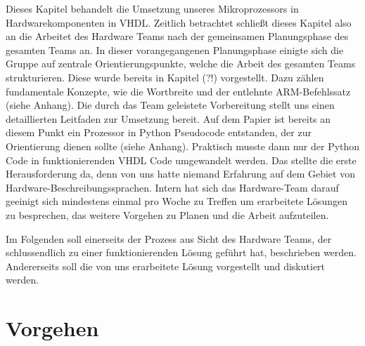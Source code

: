 \documentclass[paper=a4,fontsize=12pt,twocolumn]{scrreprt}
\begin{document}
Dieses Kapitel behandelt die Umsetzung unseres Mikroprozessors in Hardwarekomponenten in VHDL.
Zeitlich betrachtet schließt dieses Kapitel also an die Arbeitet des Hardware Teams nach der gemeinsamen Planungsphase des gesamten Teams an.
In dieser vorangegangenen Planungsphase einigte sich die Gruppe auf zentrale Orientierungspunkte, welche die Arbeit des gesamten Teams strukturieren.
Diese wurde bereits in Kapitel (?!) vorgestellt.
Dazu zählen fundamentale Konzepte, wie die Wortbreite und der entlehnte ARM-Befehlssatz (siehe Anhang).
Die durch das Team geleistete Vorbereitung stellt uns einen detaillierten Leitfaden zur Umsetzung bereit.
Auf dem Papier ist bereits an diesem Punkt ein Prozessor in Python Pseudocode entstanden, der zur Orientierung dienen sollte (siehe Anhang).
Praktisch musste dann nur der Python Code in funktionierenden VHDL Code umgewandelt werden.
Das stellte die erste Herausforderung da, denn von uns hatte niemand Erfahrung auf dem Gebiet von Hardware-Beschreibungssprachen.
Intern hat sich das Hardware-Team darauf geeinigt sich mindestens einmal pro Woche zu Treffen um erarbeitete Lösungen zu besprechen, das weitere Vorgehen zu Planen und die Arbeit aufzuteilen.

Im Folgenden soll einerseits der Prozess aus Sicht des Hardware Teams, der schlussendlich zu einer funktionierenden Lösung geführt hat, beschrieben werden.
Andererseits soll die von uns erarbeitete Lösung vorgestellt und diskutiert werden.


\section{Vorgehen}
\end{document}
